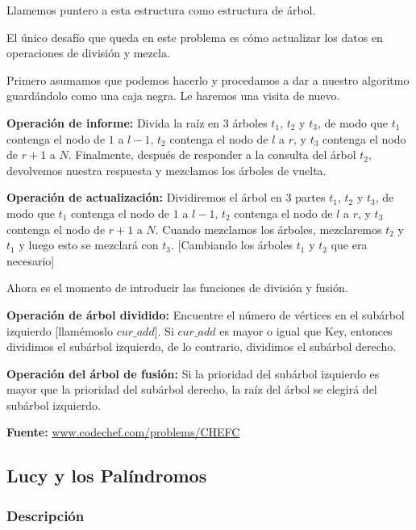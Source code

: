 \documentclass[12pt]{article}
\newcommand{\nl}{\vspace{0.3cm}}
\begin{document}
Llamemos puntero a esta estructura como estructura de árbol.

\nl

El único desafío que queda en este problema es cómo actualizar los datos en operaciones de división y mezcla.

\nl

Primero asumamos que podemos hacerlo y procedamos a dar a nuestro algoritmo guardándolo como una caja negra. Le haremos una visita de nuevo.

\nl

\textbf{Operación de informe:} Divida la raíz en 3 árboles $t_1$, $t_2$ y $t_3$, de modo que $t_1$ contenga el nodo de $1$ a $l-1$, $t_2$ contenga el nodo de $l$ a $r$, y $t_3$ contenga el nodo de $r + 1$ a $N$. Finalmente, después de responder a la consulta del árbol $t_2$, devolvemos nuestra respuesta y mezclamos los árboles de vuelta.

\nl

\textbf{Operación de actualización:} Dividiremos el árbol en 3 partes $t_1$, $t_2$ y $t_3$, de modo que $t_1$ contenga el nodo de $1$ a $l-1$, $t_2$ contenga el nodo de $l$ a $r$, y $t_3$ contenga el nodo de $r + 1$ a $N$. Cuando mezclamos los árboles, mezclaremos $t_2$ y $t_1$ y luego esto se mezclará con $t_3$. [Cambiando los árboles $t_1$ y $t_2$ que era necesario]

\nl

Ahora es el momento de introducir las funciones de división y fusión.

\nl

\textbf{Operación de árbol dividido:} Encuentre el número de vértices en el subárbol izquierdo [llamémoslo $cur\_add$]. Si $cur\_add$ es mayor o igual que Key, entonces dividimos el subárbol izquierdo, de lo contrario, dividimos el subárbol derecho.

\nl

\textbf{Operación del árbol de fusión:} Si la prioridad del subárbol izquierdo es mayor que la prioridad del subárbol derecho, la raíz del árbol se elegirá del subárbol izquierdo.

\nl

\textbf{Fuente:} \href{https://www.codechef.com/problems/CHEFC}{www.codechef.com/problems/CHEFC}

\subsection{Lucy y los Palíndromos}

\subsubsection{Descripción}
\end{document}

